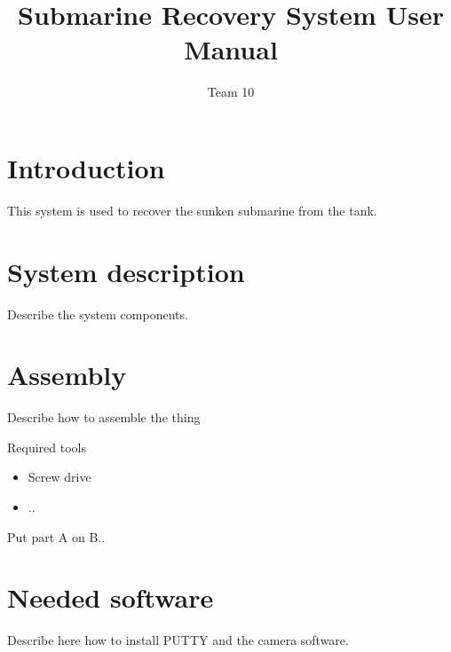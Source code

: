 \documentclass[letterpaper, 12 pt]{article}
\begin{document}
\title{Submarine Recovery System User Manual}
\author{Team 10}
\maketitle
\pagestyle{empty}

\newpage
\tableofcontents
\newpage

\section{Introduction}
This system is used to recover the sunken submarine from the tank.
\section{System description}
Describe the system components.
\section{Assembly}
Describe how to assemble the thing

Required tools
\begin{itemize}
\item Screw drive
\item ..
\end{itemize}

Put part A on B..
\section{Needed software}
Describe here how to install PUTTY and the camera software.
\end{document}
